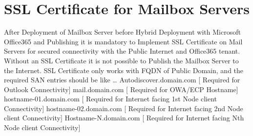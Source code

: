 \section{SSL Certificate for Mailbox Servers}
After Deployment of Mailbox Server before Hybrid Deployment with Microsoft Office365 and Publishing it is mandatory to Implement SSL Certificate on Mail Servers for secured connectivity with the Public Internet and Office365 tenant.
Without an SSL Certificate it is not possible to Publish the Mailbox Server to the Internet. 
SSL Certificate only works with FQDN of Public Domain, and the required SAN entries should be like …
Autodiscover.domain.com [ Required for Outlook Connectivity]
mail.domain.com [ Required for OWA/ECP Hostname]
hostname-01.domain.com [ Required for Internet facing 1st Node client Connectivity]
hostname-02.domain.com [ Required for Internet facing 2nd Node client Connectivity]
Hostname-N.domain.com [ Required for Internet facing Nth Node client Connectivity]
